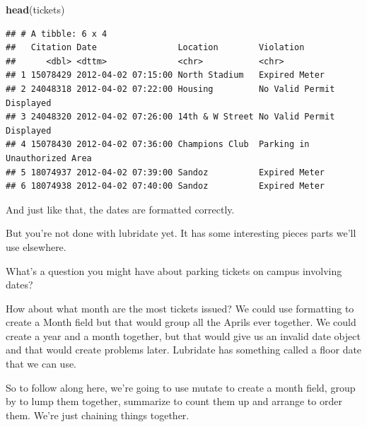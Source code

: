 \documentclass[]{book}
\newenvironment{Shaded}{\begin{snugshade}}{\end{snugshade}}
\newcommand{\DataTypeTok}[1]{\textcolor[rgb]{0.13,0.29,0.53}{#1}}
\newcommand{\KeywordTok}[1]{\textcolor[rgb]{0.13,0.29,0.53}{\textbf{#1}}}
\newcommand{\NormalTok}[1]{#1}
\newcommand{\OperatorTok}[1]{\textcolor[rgb]{0.81,0.36,0.00}{\textbf{#1}}}
\newcommand{\StringTok}[1]{\textcolor[rgb]{0.31,0.60,0.02}{#1}}
\begin{document}
\begin{Shaded}
\begin{Highlighting}[]
\KeywordTok{head}\NormalTok{(tickets)}
\end{Highlighting}
\end{Shaded}

\begin{verbatim}
## # A tibble: 6 x 4
##   Citation Date                Location        Violation                   
##      <dbl> <dttm>              <chr>           <chr>                       
## 1 15078429 2012-04-02 07:15:00 North Stadium   Expired Meter               
## 2 24048318 2012-04-02 07:22:00 Housing         No Valid Permit Displayed   
## 3 24048320 2012-04-02 07:26:00 14th & W Street No Valid Permit Displayed   
## 4 15078430 2012-04-02 07:36:00 Champions Club  Parking in Unauthorized Area
## 5 18074937 2012-04-02 07:39:00 Sandoz          Expired Meter               
## 6 18074938 2012-04-02 07:40:00 Sandoz          Expired Meter
\end{verbatim}

And just like that, the dates are formatted correctly.

But you're not done with lubridate yet. It has some interesting pieces parts we'll use elsewhere.

What's a question you might have about parking tickets on campus involving dates?

How about what month are the most tickets issued? We could use formatting to create a Month field but that would group all the Aprils ever together. We could create a year and a month together, but that would give us an invalid date object and that would create problems later. Lubridate has something called a floor date that we can use.

So to follow along here, we're going to use mutate to create a month field, group by to lump them together, summarize to count them up and arrange to order them. We're just chaining things together.

\begin{Shaded}
\end{Shaded}
\end{document}
